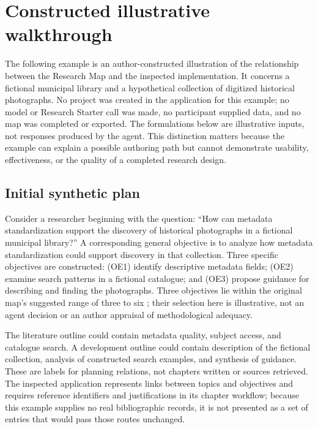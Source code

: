 \section{Constructed illustrative walkthrough}
\label{sec:walkthrough}

The following example is an author-constructed illustration of the relationship between the Research Map and the inspected implementation. It concerns a fictional municipal library and a hypothetical collection of digitized historical photographs. No project was created in the application for this example; no model or Research Starter call was made, no participant supplied data, and no map was completed or exported. The formulations below are illustrative inputs, not responses produced by the agent. This distinction matters because the example can explain a possible authoring path but cannot demonstrate usability, effectiveness, or the quality of a completed research design.

\subsection{Initial synthetic plan}

Consider a researcher beginning with the question: ``How can metadata standardization support the discovery of historical photographs in a fictional municipal library?'' A corresponding general objective is to analyze how metadata standardization could support discovery in that collection. Three specific objectives are constructed: (OE1) identify descriptive metadata fields; (OE2) examine search patterns in a fictional catalogue; and (OE3) propose guidance for describing and finding the photographs. Three objectives lie within the original map's suggested range of three to six \cite{franca2026map}; their selection here is illustrative, not an agent decision or an author appraisal of methodological adequacy.

The literature outline could contain metadata quality, subject access, and catalogue search. A development outline could contain description of the fictional collection, analysis of constructed search examples, and synthesis of guidance. These are labels for planning relations, not chapters written or sources retrieved. The inspected application represents links between topics and objectives and requires reference identifiers and justifications in its chapter workflow; because this example supplies no real bibliographic records, it is not presented as a set of entries that would pass those routes unchanged.

